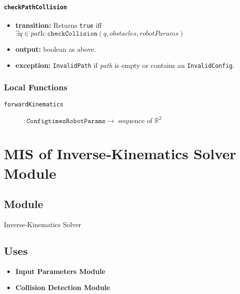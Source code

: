 \documentclass[12pt, titlepage]{article}
\begin{document}
\paragraph{\texttt{checkPathCollision}}
\begin{itemize}
  \item \textbf{transition:} Returns \texttt{true} iff
        $\exists q\in\textit{path}:\texttt{checkCollision}(q,\textit{obstacles},\textit{robotParams})$
  \item \textbf{output:} boolean as above.
  \item \textbf{exception:} \texttt{InvalidPath} if \textit{path} is empty or contains an \texttt{InvalidConfig}.
\end{itemize}

\subsubsection{Local Functions}
\begin{description}
  \item[\texttt{forwardKinematics}] $\!:\! \texttt{Config} \texttt{times} \texttt{RobotParams} \rightarrow$ sequence of $\mathbb{R}^2$
\end{description}

\newpage



\section{MIS of Inverse‑Kinematics Solver Module}
\label{mod:ik}

\subsection{Module}
Inverse‑Kinematics Solver

\subsection{Uses}
\begin{itemize}
  \item \textbf{Input Parameters Module}
  \item \textbf{Collision Detection Module}
\end{itemize}
\end{document}
